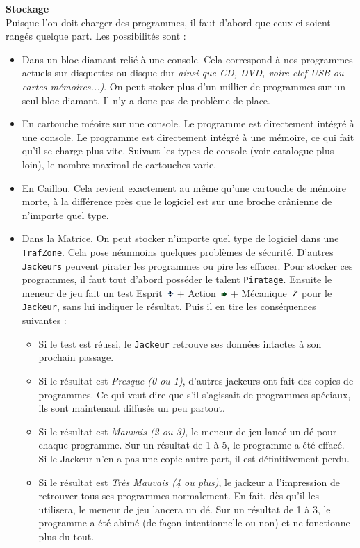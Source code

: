 \documentclass[11pt,twoside,a4paper]{article}
\def\imgESPRI{\includegraphics[width=0.25cm]{../../../../../imgGraphics/rolePlayingGame/SimulacreS/mini12x12/esprit.png} }
\def\imgACTIO{\includegraphics[width=0.25cm]{../../../../../imgGraphics/rolePlayingGame/SimulacreS/mini12x12/action.png} }
\def\imgMECAN{\includegraphics[width=0.25cm]{../../../../../imgGraphics/rolePlayingGame/SimulacreS/mini12x12/mecanique.png} }
\begin{document}
\begin{multicols*}{2}
\textbf{Stockage}~\\
Puisque l'on doit charger des programmes, il faut d'abord que ceux-ci soient rang{\'e}s quelque part. Les possibilit{\'e}s sont : 
\begin{itemize}
	\small
	\item[$\bullet$] Dans un bloc diamant reli{\'e} {\`a} une console. Cela correspond {\`a} nos programmes actuels sur disquettes ou disque dur \emph{ainsi que CD, DVD, voire clef USB ou cartes m{\'e}moires...)}. On peut stoker plus d'un millier de programmes sur un seul bloc diamant. Il n'y a donc pas de probl{\`e}me de place. 
	\item[$\bullet$] En cartouche m{\'e}oire sur une console. Le programme est directement int{\'e}gr{\'e} {\`a} une console. Le programme est directement int{\'e}gr{\'e} {\`a} une m{\'e}moire, ce qui fait qu'il se charge plus vite. Suivant les types de console (voir catalogue plus loin), le nombre maximal de cartouches varie. 
	\item[$\bullet$] En Caillou. Cela revient exactement au m{\^e}me qu'une cartouche de m{\'e}moire morte, {\`a} la diff{\'e}rence pr{\`e}s que le logiciel est sur une broche cr{\^a}nienne de n'importe quel type. 
	\item[$\bullet$] Dans la Matrice. On peut stocker n'importe quel type de logiciel dans une \texttt{TrafZone}. Cela pose n{\'e}anmoins quelques probl{\`e}mes de s{\'e}curit{\'e}. D'autres \texttt{Jackeurs} peuvent pirater les programmes ou pire les effacer. Pour stocker ces programmes, il faut tout d'abord poss{\'e}der le talent \texttt{Piratage}. Ensuite le meneur de jeu fait un test Esprit~\imgESPRI  + Action~\imgACTIO  + M{\'e}canique~\imgMECAN  pour le \texttt{Jackeur}, sans lui indiquer le r{\'e}sultat. Puis il en tire les cons{\'e}quences suivantes : 
	\begin{itemize}
		\item[\textbf{a)}] Si le test est r{\'e}ussi, le \texttt{Jackeur} retrouve ses donn{\'e}es intactes {\`a} son prochain passage. 
		\item[\textbf{b)}] Si le r{\'e}sultat est \emph{Presque (0 ou 1)}, d'autres jackeurs ont fait des copies de programmes. Ce qui veut dire que s'il s'agissait de programmes sp{\'e}ciaux, ils sont maintenant diffus{\'e}s un peu partout. 
		\item[\textbf{c)}] Si le r{\'e}sultat est \emph{Mauvais (2 ou 3)}, le meneur de jeu lanc{\'e} un d{\'e} pour chaque programme. Sur un r{\'e}sultat de 1 {\`a} 5, le programme a {\'e}t{\'e} effac{\'e}. Si le Jackeur n'en a pas une copie autre part, il est d{\'e}finitivement perdu. 
		\item[\textbf{d)}] Si le r{\'e}sultat est \emph{Tr{\`e}s Mauvais (4 ou plus)}, le jackeur a l'impression de retrouver tous ses programmes normalement. En fait, d{\`e}s qu'il les utilisera, le meneur de jeu lancera un d{\'e}. Sur un r{\'e}sultat de 1 {\`a} 3, le programme a {\'e}t{\'e} abim{\'e} (de fa\c{c}on intentionnelle ou non) et ne fonctionne plus du tout. 
	\end{itemize}
\end{itemize} %


\end{multicols*}
\end{document}
